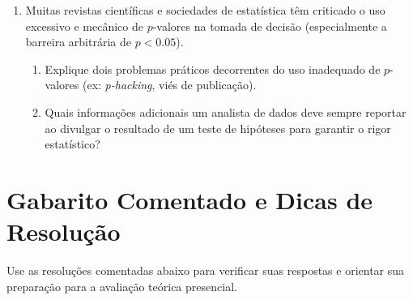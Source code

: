 \documentclass[12pt]{article}
\begin{document}
\begin{enumerate}[label=\textbf{Questão \arabic*}]
    \item Muitas revistas científicas e sociedades de estatística têm criticado o uso excessivo e mecânico de $p$-valores na tomada de decisão (especialmente a barreira arbitrária de $p < 0.05$).
    \begin{enumerate}[label=\alph*)]
        \item Explique dois problemas práticos decorrentes do uso inadequado de $p$-valores (ex: \textit{p-hacking}, viés de publicação).
        \item Quais informações adicionais um analista de dados deve sempre reportar ao divulgar o resultado de um teste de hipóteses para garantir o rigor estatístico?
    \end{enumerate}
\end{enumerate}

\pagebreak

\section*{Gabarito Comentado e Dicas de Resolução}

\begin{tcolorbox}[colback=yellow!10!white,colframe=yellow!50!black,title=\textbf{Dica de Estudo}]
Use as resoluções comentadas abaixo para verificar suas respostas e orientar sua preparação para a avaliação teórica presencial.
\end{tcolorbox}
\end{document}
